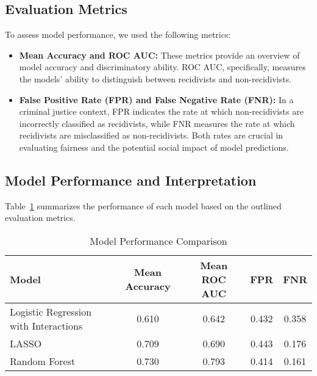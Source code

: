 \documentclass[12pt]{article}
\begin{document}
\subsection{Evaluation Metrics}
To assess model performance, we used the following metrics:
\begin{itemize}
    \item \textbf{Mean Accuracy and ROC AUC:} These metrics provide an overview of model accuracy and discriminatory ability. ROC AUC, specifically, measures the models’ ability to distinguish between recidivists and non-recidivists.
    \item \textbf{False Positive Rate (FPR) and False Negative Rate (FNR):} In a criminal justice context, FPR indicates the rate at which non-recidivists are incorrectly classified as recidivists, while FNR measures the rate at which recidivists are misclassified as non-recidivists. Both rates are crucial in evaluating fairness and the potential social impact of model predictions.
\end{itemize}

\subsection{Model Performance and Interpretation}
Table~\ref{tab:model_performance} summarizes the performance of each model based on the outlined evaluation metrics.

\begin{table}[h!]
    \centering
    \caption{Model Performance Comparison}
    \begin{tabular}{lcccc}
        \toprule
        Model & Mean Accuracy & Mean ROC AUC & FPR & FNR \\
        \midrule
        Logistic Regression with Interactions & 0.610 & 0.642 & 0.432 & 0.358 \\
        LASSO & 0.709 & 0.690 & 0.443 & 0.176 \\
        Random Forest & 0.730 & 0.793 & 0.414 & 0.161 \\
        \bottomrule
    \end{tabular}
    \label{tab:model_performance}
\end{table}
\end{document}

